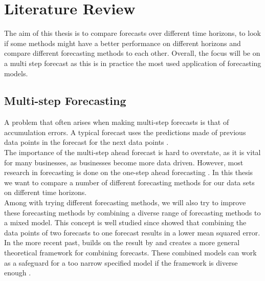 \section{Literature Review}
The aim of this thesis is to compare forecasts over different time horizons, to look if some methods might have a better performance on different horizons and compare different forecasting methods to each other. Overall, the focus will be on a multi step forecast as this is in practice the most used application of forecasting models.

\subsection{Multi-step Forecasting}
A problem that often arises when making multi-step forecasts is that of accumulation errors. A typical forecast uses the predictions made of previous data points in the forecast for the next data points \citep{Chevillon2007DirectForecasting}.\\

The importance of the multi-step ahead forecast is hard to overstate, as it is vital for many businesses, as businesses become more data driven. However, most research in forecasting is done on the one-step ahead forecasting \citep{Duan2021LearningForecasting}. In this thesis we want to compare a number of different forecasting methods for our data sets on different time horizons.\\


Among with trying different forecasting methods, we will also try to improve these forecasting methods by combining a diverse range of forecasting methods to a mixed model. This concept is well studied \citep{Amstrong2001CombiningForecasts, Stock2004CombinationSet} since \cite{Bates1969TheForecasts} showed that combining the data points of two forecasts to one forecast results in a lower mean squared error. In the more recent past, \cite{Yang2004CombiningResults} builds on the result by \cite{Bates1969TheForecasts} and creates a more general theoretical framework for combining forecasts. These combined models can work as a safeguard for a too narrow specified model if the framework is diverse enough \citep{Amstrong2001CombiningForecasts}.\\


